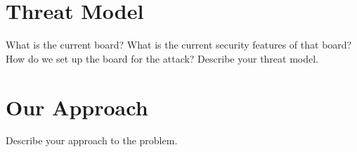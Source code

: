\section{Threat Model}
\label{sec:threat}

What is the current board? What is the current security features of that board?  How do we set up the board for the attack? 
Describe your threat model.

\section{Our Approach}
\label{sec:approach}

Describe your approach to the problem.


